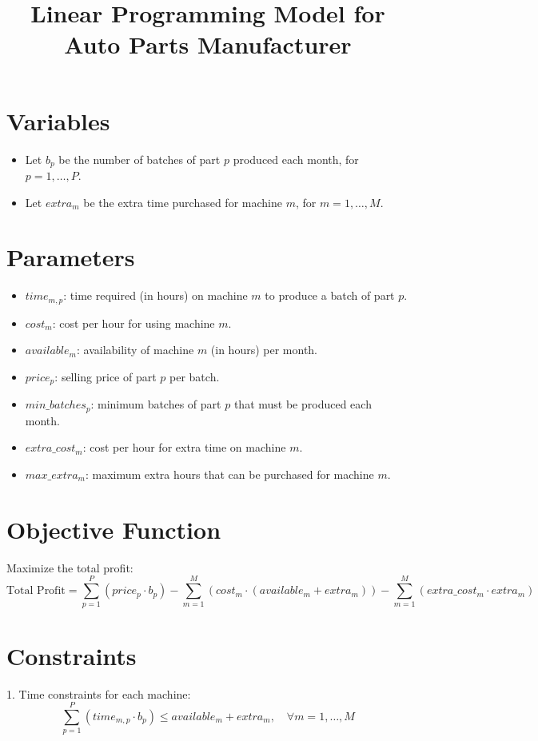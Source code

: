 \documentclass{article}
\begin{document}
\title{Linear Programming Model for Auto Parts Manufacturer}
\author{}
\date{}
\maketitle

\section*{Variables}
\begin{itemize}
    \item Let \( b_p \) be the number of batches of part \( p \) produced each month, for \( p = 1, \dots, P \).
    \item Let \( extra_m \) be the extra time purchased for machine \( m \), for \( m = 1, \dots, M \).
\end{itemize}

\section*{Parameters}
\begin{itemize}
    \item \( time_{m,p} \): time required (in hours) on machine \( m \) to produce a batch of part \( p \).
    \item \( cost_{m} \): cost per hour for using machine \( m \).
    \item \( available_{m} \): availability of machine \( m \) (in hours) per month.
    \item \( price_{p} \): selling price of part \( p \) per batch.
    \item \( min\_batches_{p} \): minimum batches of part \( p \) that must be produced each month.
    \item \( extra\_cost_{m} \): cost per hour for extra time on machine \( m \).
    \item \( max\_extra_{m} \): maximum extra hours that can be purchased for machine \( m \).
\end{itemize}

\section*{Objective Function}
Maximize the total profit:
\[
\text{Total Profit} = \sum_{p=1}^{P} (price_{p} \cdot b_{p}) - \sum_{m=1}^{M} (cost_{m} \cdot (available_{m} + extra_{m})) - \sum_{m=1}^{M} (extra\_cost_{m} \cdot extra_{m})
\]

\section*{Constraints}
1. Time constraints for each machine:
\[
\sum_{p=1}^{P} (time_{m,p} \cdot b_{p}) \leq available_{m} + extra_{m}, \quad \forall m = 1, \dots, M
\]
\end{document}
